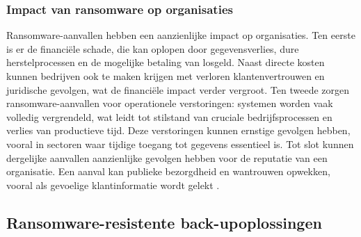 \subsubsection{Impact van ransomware op organisaties}
Ransomware-aanvallen hebben een aanzienlijke impact op organisaties. Ten eerste is er de financiële schade, die kan oplopen door gegevensverlies, dure herstelprocessen en de mogelijke betaling van losgeld. Naast directe kosten kunnen bedrijven ook te maken krijgen met verloren klantenvertrouwen en juridische gevolgen, wat de financiële impact verder vergroot. Ten tweede zorgen ransomware-aanvallen voor operationele verstoringen: systemen worden vaak volledig vergrendeld, wat leidt tot stilstand van cruciale bedrijfsprocessen en verlies van productieve tijd. Deze verstoringen kunnen ernstige gevolgen hebben, vooral in sectoren waar tijdige toegang tot gegevens essentieel is. Tot slot kunnen dergelijke aanvallen aanzienlijke gevolgen hebben voor de reputatie van een organisatie. Een aanval kan publieke bezorgdheid en wantrouwen opwekken, vooral als gevoelige klantinformatie wordt gelekt \autocite{Connolly2020}.

\subsection{Ransomware-resistente back-upoplossingen}
